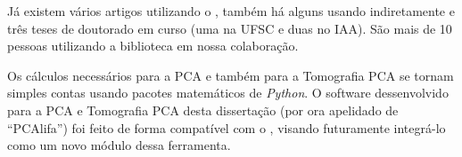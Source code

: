 Já existem vários artigos utilizando o \pycasso \citep{CidFernandes2013, CidFernandes2014, Perez2013,
GonzalezDelgado2014}, também há alguns usando indiretamente \citep{Husemann2013, IglesiasParamo2013} e três teses de
doutorado em curso (uma na UFSC e duas no IAA). São mais de 10 pessoas utilizando a biblioteca em nossa colaboração. 

Os cálculos necessários para a PCA e também para a Tomografia PCA se tornam simples contas usando pacotes matemáticos de
{\em Python}. O software dessenvolvido para a PCA e Tomografia PCA desta dissertação (por ora apelidado de ``PCAlifa'')
foi feito de forma compatível com o \pycasso, visando futuramente integrá-lo como um novo módulo dessa ferramenta.


